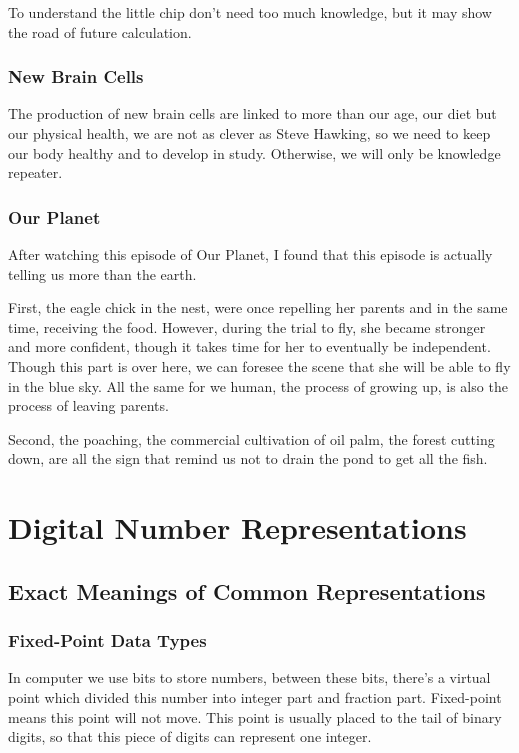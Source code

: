 \documentclass{article}
\begin{document}
To understand the little chip don't need too much knowledge, but it may show the road of future calculation.

\subsubsection{New Brain Cells}
The production of new brain cells are linked to more than our age, our diet but our physical health, we are not as clever as Steve Hawking, so we need to keep our body healthy and to develop in study. Otherwise, we will only be knowledge repeater.

\subsubsection*{Our Planet}
After watching this episode of Our Planet, I found that this episode is actually telling us more than the earth. 

First, the eagle chick in the nest, were once repelling her parents and in the same time, receiving the food. However, during the trial to fly, she became stronger and more confident, though it takes time for her to eventually be independent. Though this part is over here, we can foresee the scene that she will be able to fly in the blue sky. All the same for we human, the process of growing up, is also the process of leaving parents.

Second, the poaching, the commercial cultivation of oil palm, the forest cutting down, are all the sign that remind us not to drain the pond to get all the fish.

\section{Digital Number Representations}

\subsection{Exact Meanings of Common Representations}

\subsubsection{Fixed-Point Data Types}
In computer we use bits to store numbers, between these bits, there's a virtual point which divided this number into integer part and fraction part. Fixed-point means this point will not move. This point is usually placed to the tail of binary digits, so that this piece of digits can represent one integer.
\end{document}
